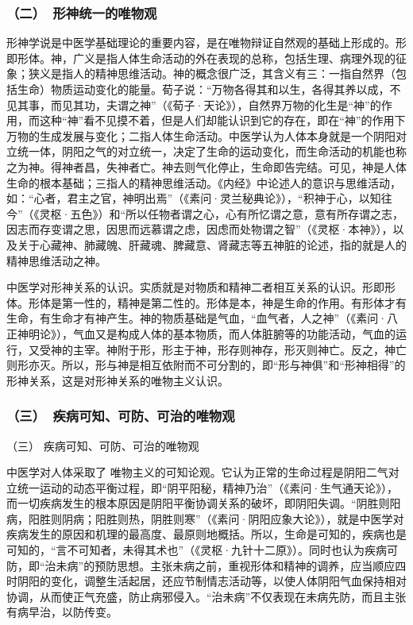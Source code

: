 \documentclass[a4paper,12pt,UTF8,twoside]{ctexbook}
\begin{document}
\subsubsection{（二）\ 形神统一的唯物观}

形神学说是中医学基础理论的重要内容，是在唯物辩证自然观的基础上形成的。形即形体。神，广义是指人体生命活动的外在表现的总称，包括生理、病理外现的征象；狭义是指人的精神思维活动。神的概念很广泛，其含义有三：一指自然界（包括生命）物质运动变化的能量。荀子说：“万物各得其和以生，各得其养以成，不见其事，而见其功，夫谓之神”（《荀子·天论》），自然界万物的化生是“神”的作用，而这种“神”看不见摸不着，但是人们却能认识到它的存在，即在“神”的作用下万物的生成发展与变化；二指人体生命活动。中医学认为人体本身就是一个阴阳对立统一体，阴阳之气的对立统一，决定了生命的运动变化，而生命活动的机能也称之为神。得神者昌，失神者亡。神去则气化停止，生命即告完结。可见，神是人体生命的根本基础；三指人的精神思维活动。《内经》中论述人的意识与思维活动，如：“心者，君主之官，神明出焉”（《素问·灵兰秘典论》），“积神于心，以知往今”（《灵枢·五色》）和“所以任物者谓之心，心有所忆谓之意，意有所存谓之志，因志而存变谓之思，因思而远慕谓之虑，因虑而处物谓之智”（《灵枢·本神》），以及关于心藏神、肺藏魄、肝藏魂、脾藏意、肾藏志等五神脏的论述，指的就是人的精神思维活动之神。

中医学对形神关系的认识。实质就是对物质和精神二者相互关系的认识。形即形体。形体是第一性的，精神是第二性的。形体是本，神是生命的作用。有形体才有生命，有生命才有神产生。神的物质基础是气血，“血气者，人之神”（《素问·八正神明论》），气血又是构成人体的基本物质，而人体脏腑等的功能活动，气血的运行，又受神的主宰。神附于形，形主于神，形存则神存，形灭则神亡。反之，神亡则形亦灭。所以，形与神是相互依附而不可分割的，即“形与神俱”和“形神相得”的形神关系，这是对形神关系的唯物主义认识。

\subsubsection{（三）\ 疾病可知、可防、可治的唯物观}

（三） 疾病可知、可防、可治的唯物观

中医学对人体采取了 唯物主义的可知论观。它认为正常的生命过程是阴阳二气对立统一运动的动态平衡过程，即“阴平阳秘，精神乃治”（《素问·生气通天论》），而一切疾病发生的根本原因是阴阳平衡协调关系的破坏，即阴阳失调。“阴胜则阳病，阳胜则阴病；阳胜则热，阴胜则寒”（《素问·阴阳应象大论》），就是中医学对疾病发生的原因和机理的最高度、最原则地概括。所以，生命是可知的，疾病也是可知的，“言不可知者，未得其术也”（《灵枢·九针十二原》）。同时也认为疾病可防，即“治未病”的预防思想。主张未病之前，重视形体和精神的调养，应当顺应四时阴阳的变化，调整生活起居，还应节制情志活动等，以使人体阴阳气血保持相对协调，从而使正气充盛，防止病邪侵入。“治未病”不仅表现在未病先防，而且主张有病早治，以防传变。
\end{document}
